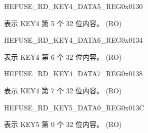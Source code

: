 \begin{register}{H}{EFUSE\_RD\_KEY4\_DATA5\_REG}{0x0130}\label{regdesc:EFUSERDKEY4DATA5REG}
%
\regnewline%
\begin{regdesc}\begin{reglist}
\label{fielddesc:EFUSEKEY4DATA5}\item [EFUSE\_KEY4\_DATA5] 表示 KEY4 第 5 个 32 位内容。 (RO)
\end{reglist}\end{regdesc}
\end{register}


\begin{register}{H}{EFUSE\_RD\_KEY4\_DATA6\_REG}{0x0134}\label{regdesc:EFUSERDKEY4DATA6REG}
%
\regnewline%
\begin{regdesc}\begin{reglist}
\label{fielddesc:EFUSEKEY4DATA6}\item [EFUSE\_KEY4\_DATA6] 表示 KEY4 第 6 个 32 位内容。 (RO)
\end{reglist}\end{regdesc}
\end{register}


\begin{register}{H}{EFUSE\_RD\_KEY4\_DATA7\_REG}{0x0138}\label{regdesc:EFUSERDKEY4DATA7REG}
%
\regnewline%
\begin{regdesc}\begin{reglist}
\label{fielddesc:EFUSEKEY4DATA7}\item [EFUSE\_KEY4\_DATA7] 表示 KEY4 第 7 个 32 位内容。 (RO)
\end{reglist}\end{regdesc}
\end{register}


\begin{register}{H}{EFUSE\_RD\_KEY5\_DATA0\_REG}{0x013C}\label{regdesc:EFUSERDKEY5DATA0REG}
%
\regnewline%
\begin{regdesc}\begin{reglist}
\label{fielddesc:EFUSEKEY5DATA0}\item [EFUSE\_KEY5\_DATA0] 表示 KEY5 第 0 个 32 位内容。 (RO)
\end{reglist}\end{regdesc}
\end{register}



